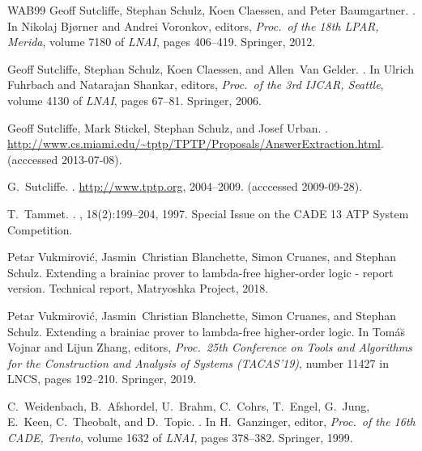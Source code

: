 \documentclass{report}
\begin{document}
\begin{thebibliography}{WAB{\etalchar{+}}99}
Geoff Sutcliffe, Stephan Schulz, Koen Claessen, and Peter Baumgartner.
.
\newblock In Nikolaj Bj{\o}rner and Andrei Voronkov, editors, {\em Proc.\ of
  the 18th LPAR, Merida}, volume 7180 of {\em LNAI}, pages 406--419. Springer,
  2012.

Geoff Sutcliffe, Stephan Schulz, Koen Claessen, and Allen~Van Gelder.
.
\newblock In Ulrich Fuhrbach and Natarajan Shankar, editors, {\em Proc.\ of the
  3rd IJCAR, Seattle}, volume 4130 of {\em LNAI}, pages 67--81. Springer, 2006.

Geoff Sutcliffe, Mark Stickel, Stephan Schulz, and Josef Urban.
.
\newblock
  \url{http://www.cs.miami.edu/~tptp/TPTP/Proposals/AnswerExtraction.html}.
\newblock (acccessed 2013-07-08).

G.~Sutcliffe.
.
\newblock \url{http://www.tptp.org}, 2004--2009.
\newblock (acccessed 2009-09-28).

T.~Tammet.
.
, 18(2):199--204, 1997.
\newblock Special Issue on the CADE 13 ATP System Competition.

Petar Vukmirovi{\'c}, Jasmin~Christian Blanchette, Simon Cruanes, and Stephan
  Schulz.
\newblock Extending a brainiac prover to lambda-free higher-order logic -
  report version.
\newblock Technical report, Matryoshka Project, 2018.

Petar Vukmirovi{\'c}, Jasmin~Christian Blanchette, Simon Cruanes, and Stephan
  Schulz.
\newblock Extending a brainiac prover to lambda-free higher-order logic.
\newblock In Tom{\'a}{\u s} Vojnar and Lijun Zhang, editors, {\em Proc.\ 25th
  Conference on Tools and Algorithms for the Construction and Analysis of
  Systems (TACAS'19)}, number 11427 in LNCS, pages 192--210. Springer, 2019.

C.~Weidenbach, B.~Afshordel, U.~Brahm, C.~Cohrs, T.~Engel, G.~Jung, E.~Keen,
  C.~Theobalt, and D.~Topic.
.
\newblock In H.~Ganzinger, editor, {\em Proc.\ of the 16th CADE, Trento},
  volume 1632 of {\em LNAI}, pages 378--382. Springer, 1999.


\end{thebibliography}
\end{document}
